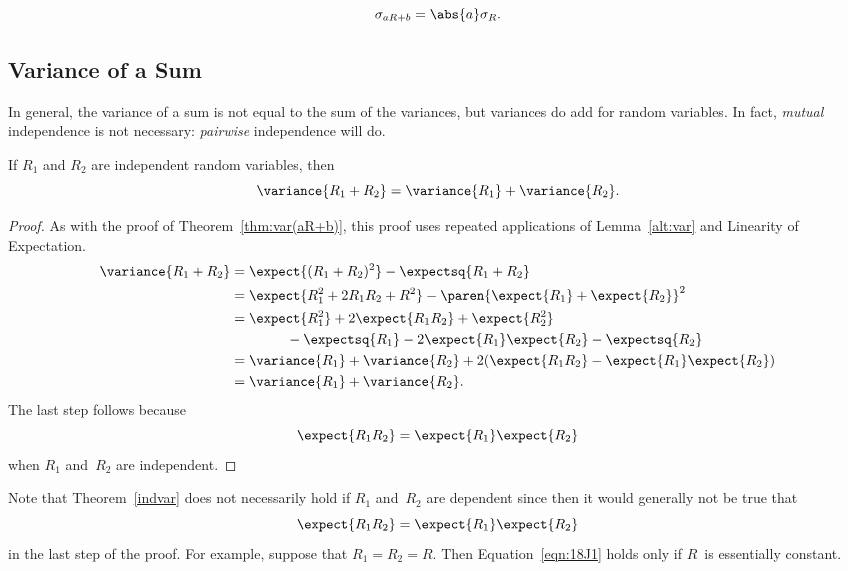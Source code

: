 \begin{corollary}
\[
\sigma_{aR+b} = \abs{a}\sigma_{R}.
\]
\end{corollary}

\subsection{Variance of a Sum}

In general, the variance of a sum is not equal to the sum of the
variances, but variances do add for \emph{} random
variables.  In fact,  \emph{mutual}
independence is not necessary: 
\emph{pairwise} independence will do.

\begin{theorem}\label{indvar}
If $R_1$ and $R_2$ are independent random variables, then
\begin{equation}\label{vR+R}
\variance{R_1 + R_2} = \variance{R_1} + \variance{R_2}.
\end{equation}
\end{theorem}

\begin{proof}

As with the proof of Theorem~\ref{thm:var(aR+b)}, this proof uses
repeated applications of Lemma~\ref{alt:var} and Linearity of
Expectation.
\begin{align*}
\variance{R_1 + R_2}
    &= \expect{(R_1 + R_2)^2} - \expectsq{R_1 + R_2} \\
    &= \expect{R_1^2 + 2 R_1 R_2 + R^2}
            - \paren{\expect{R_1} + \expect{R_2}}^2 \\
    &= \expect{R_1^2} + 2 \expect{R_1 R_2} + \expect{R_2^2} \\
    &\qquad\qquad
            - \expectsq{R_1} - 2 \expect{R_1} \expect{R_2}
            - \expectsq{R_2} \\
    &= \variance{R_1} + \variance{R_2}
            + 2( \expect{R_1 R_2} - \expect{R_1} \expect{R_2} ) \\
    &= \variance{R_1} + \variance{R_2}.
\end{align*}
The last step follows because
\begin{equation*}
    \expect{R_1 R_2} = \expect{R_1} \expect{R_2}
\end{equation*}
when $R_1$ and~$R_2$ are independent.
\end{proof}

Note that Theorem~\ref{indvar} does not necessarily hold if $R_1$
and~$R_2$ are dependent since then it would generally not be true that
\begin{equation}\label{eqn:18J1}
    \expect{R_1 R_2} = \expect{R_1} \expect{R_2}
\end{equation}
in the last step of the proof.  For example, suppose that $R_1 = R_2 =
R$.  Then Equation~\ref{eqn:18J1} holds only if $R$~is essentially
constant.

